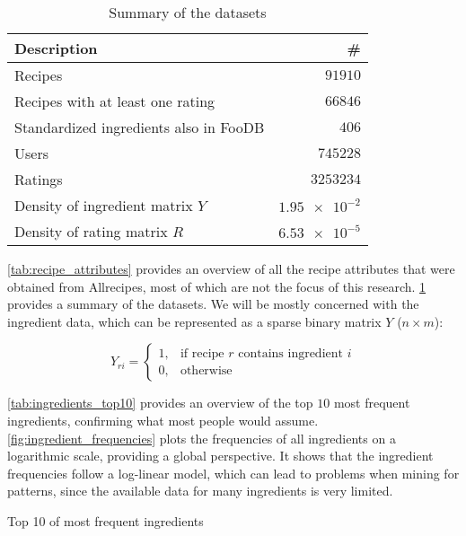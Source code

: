 \begin{table}[htbp]
	\caption{Summary of the datasets}
	\label{tab:dataset_summary}
	
	\centering
	\begin{tabular}{l r}
		\toprule
		\textbf{Description} & \textbf{\#} \\
		\midrule
		Recipes & $\num{91910}$ \\
		Recipes with at least one rating & $\num{66846}$ \\
		Standardized ingredients also in FooDB & $\num{406}$ \\
		Users & $\num{745228}$ \\
		Ratings & $\num{3253234}$ \\ 
		Density of ingredient matrix $Y$ & $\num{1.95e-2}$ \\
		Density of rating matrix $R$ & $\num{6.53e-5}$ \\
		\bottomrule
	\end{tabular}
\end{table}


\cref{tab:recipe_attributes} provides an overview of all the recipe attributes that were obtained from Allrecipes, most of which are not the focus of this research.
\cref{tab:dataset_summary} provides a summary of the datasets.
We will be mostly concerned with the ingredient data, which can be represented as a sparse binary matrix $Y$ ($n \times m$):

\begin{equation*}
	\tag{Ingredient matrix}
	Y_{ri}=
	\begin{cases}
	    1,& \text{if recipe } r \text{ contains ingredient } i \\
	    0,& \text{otherwise}
	\end{cases}
\end{equation*}

\cref{tab:ingredients_top10} provides an overview of the top $10$ most frequent ingredients, confirming what most people would assume.
\cref{fig:ingredient_frequencies} plots the frequencies of all ingredients on a logarithmic scale, providing a global perspective.
It shows that the ingredient frequencies follow a log-linear model, which can lead to problems when mining for patterns, since the available data for many ingredients is very limited.

\begin{table}[htbp]
	\caption{Top 10 of most frequent ingredients}
	\label{tab:ingredients_top10}
	
	\centering
		
\end{table}

